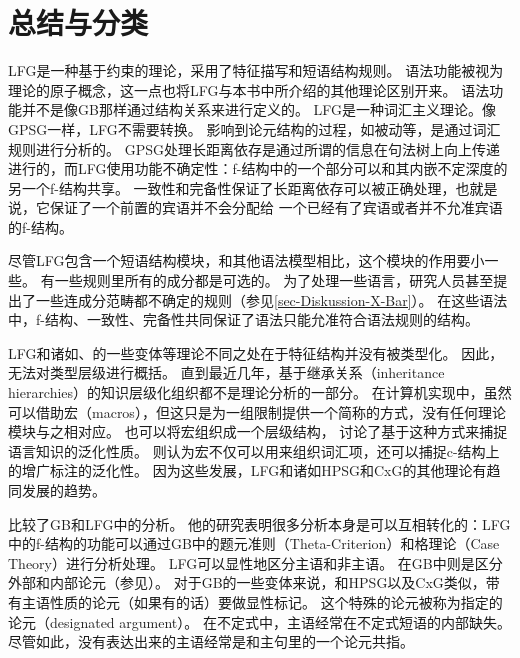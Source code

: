 \section{总结与分类}

LFG是一种基于约束的理论，采用了特征描写和短语结构规则。
语法功能被视为理论的原子概念，这一点也将LFG与本书中所介绍的其他理论区别开来。
语法功能并不是像GB那样通过结构关系来进行定义的。
LFG是一种词汇主义理论。像GPSG一样，LFG不需要转换。
影响到论元结构的过程，如被动等，是通过词汇规则进行分析的。
GPSG处理长距离依存是通过所谓的信息在句法树上向上传递进行的，而LFG使用功能不确定性：f-结构中的一个部分可以和其内嵌不定深度的另一个f-结构共享。
一致性和完备性保证了长距离依存可以被正确处理，也就是说，它保证了一个前置的宾语并不会分配给
一个已经有了宾语或者并不允准宾语的f-结构。

尽管LFG包含一个短语结构模块，和其他语法模型相比，这个模块的作用要小一些。
有一些规则里所有的成分都是可选的。
为了处理一些语言，研究人员甚至提出了一些连成分范畴都不确定的规则（参见\ref{sec-Diskussion-X-Bar}）。
在这些语法中，f-结构、一致性、完备性共同保证了语法只能允准符合语法规则的结构。

LFG和诸如\hpsgc、\cxgc 的一些变体等理论不同之处在于特征结构并没有被类型化。
因此，无法对类型层级进行概括。
直到最近几年，基于继承关系（inheritance hierarchies）的知识层级化组织都不是理论分析的一部分。
在计算机实现中，虽然可以借助宏（macros），但这只是为一组限制提供一个简称的方式，没有任何理论模块与之相对应。
也可以将宏组织成一个层级结构， 讨论了基于这种方式来捕捉语言知识的泛化性质。
 \citet*{ADT2008a}则认为宏不仅可以用来组织词汇项，还可以捕捉c-结构上的增广标注的泛化性。
因为这些发展，LFG和诸如HPSG和CxG的其他理论有趋同发展的趋势。

 \citet{Williams84a}比较了GB和LFG中的分析。
他的研究表明很多分析本身是可以互相转化的：LFG中的f-结构的功能可以通过GB中的题元准则（Theta-Criterion）和格理论（Case Theory）进行分析处理。
LFG可以显性地区分主语和非主语。
在GB中则是区分外部和内部论元（参见\citealp[\S~1.2]{Williams84a}）。
对于GB的一些变体来说，和HPSG\indexhpsgc 以及CxG\indexcxgc 类似，带有主语性质的论元（如果有的话）要做显性标记\citep{Haider86,HM94a,Mueller2003e,MR2001a}。
这个特殊的论元被称为指定的论元（designated argument）。
在不定式中，主语经常在不定式短语的内部缺失。
尽管如此，没有表达出来的主语经常是和主句里的一个论元共指。

